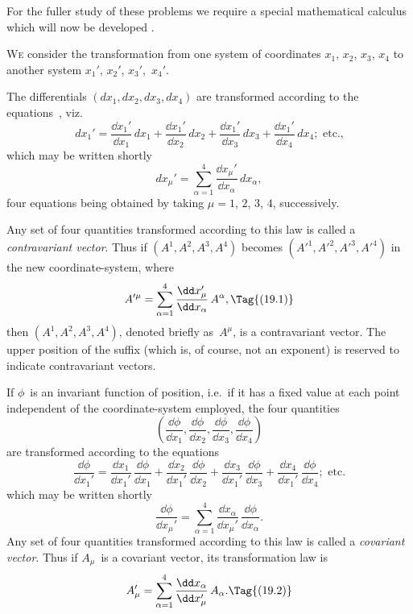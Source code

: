 \documentclass[12pt]{book}
\begin{document}
For the fuller study of these problems we require a special mathematical
calculus which will now be developed .


%
%

\lettrine{\textcolor{lettrinecolour}{W}}{e} consider the transformation from one system of coordinates $x_{1}$, $x_{2}$, $x_{3}$, $x_{4}$
%
to another system $x_{1}'$, $x_{2}'$, $x_{3}'$,~$x_{4}'$.

The differentials $(dx_{1}, dx_{2}, dx_{3}, dx_{4})$ are transformed according to the
equations~, viz.\
\[
dx_{1}' = \frac{\dd x_{1}'}{\dd x_{1}}\, dx_{1}
  + \frac{\dd x_{1}'}{\dd x_{2}}\, dx_{2}
  + \frac{\dd x_{1}'}{\dd x_{3}}\, dx_{3}
  + \frac{\dd x_{1}'}{\dd x_{4}}\, dx_{4}; \text{ etc.,}
\]
which may be written shortly
\[
dx_{\mu}' = \sum_{\alpha=1}^{4} \frac{\dd x_{\mu}'}{\dd x_{\alpha}}\, dx_{\alpha},
\]
four equations being obtained by taking $\mu = 1$, $2$, $3$, $4$, successively.

Any set of four quantities transformed according to this law is called
a \emph{contravariant vector}. Thus if $(A^{1}, A^{2}, A^{3}, A^{4})$ becomes $(A'^{1}, A'^{2}, A'^{3}, A'^{4})$ in
\index{Vector}%
the new coordinate\hyp{}system, where
\[
A'^{\mu} =  \sum_{\alpha=1}^{4} \frac{\dd x_{\mu}'}{\dd x_{\alpha}}\, A^{\alpha},
\Tag{(19.1)}
\]
then $(A^{1}, A^{2}, A^{3}, A^{4})$, denoted briefly as~$A^{\mu}$, is a contravariant vector. The
upper position of the suffix (which is, of course, not an exponent) is reserved
to indicate contravariant vectors.

If $\phi$~is an invariant function of position, i.e.\ if it has a fixed value at each
point independent of the coordinate\hyp{}system employed, the four quantities
\[
\left(\frac{\dd\phi}{\dd x_{1}},
      \frac{\dd\phi}{\dd x_{2}},
      \frac{\dd\phi}{\dd x_{3}},
      \frac{\dd\phi}{\dd x_{4}}\right)
\]
are transformed according to the equations
\[
\frac{\dd\phi}{\dd x_{1}'}
= \frac{\dd x_{1}}{\dd x_{1}'}\, \frac{\dd\phi}{\dd x_{1}}
+ \frac{\dd x_{2}}{\dd x_{1}'}\, \frac{\dd\phi}{\dd x_{2}}
+ \frac{\dd x_{3}}{\dd x_{1}'}\, \frac{\dd\phi}{\dd x_{3}}
+ \frac{\dd x_{4}}{\dd x_{1}'}\, \frac{\dd\phi}{\dd x_{4}}; \text{ etc.}
\]
which may be written shortly
\[
\frac{\dd\phi}{\dd x_{\mu}'}
= \sum_{\alpha=1}^{4} \frac{\dd x_{\alpha}}{\dd x_{\mu}'}\, \frac{\dd\phi}{\dd x_{\alpha}}.
\]
Any set of four quantities transformed according to this law is called a
\emph{covariant vector}. Thus if $A_{\mu}$~is a covariant vector, its transformation law is
\index{Covariant vector}%
\[
A_{\mu}' =  \sum_{\alpha=1}^{4} \frac{\dd x_{\alpha}}{\dd x_{\mu}'}\, A_{\alpha}.
\Tag{(19.2)}
\]
\end{document}
